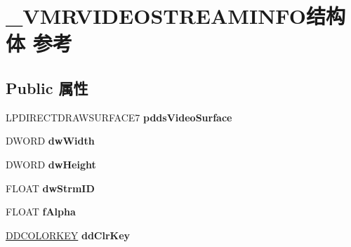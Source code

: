 \hypertarget{struct___v_m_r_v_i_d_e_o_s_t_r_e_a_m_i_n_f_o}{}\section{\+\_\+\+V\+M\+R\+V\+I\+D\+E\+O\+S\+T\+R\+E\+A\+M\+I\+N\+F\+O结构体 参考}
\label{struct___v_m_r_v_i_d_e_o_s_t_r_e_a_m_i_n_f_o}
\subsection*{Public 属性}
\begin{DoxyCompactItemize}
\item 
\mbox{\label{struct___v_m_r_v_i_d_e_o_s_t_r_e_a_m_i_n_f_o_af0eb72a4b7293354ee675c217efdfc65}} 
L\+P\+D\+I\+R\+E\+C\+T\+D\+R\+A\+W\+S\+U\+R\+F\+A\+C\+E7 {\bfseries pdds\+Video\+Surface}
\item 
\mbox{\label{struct___v_m_r_v_i_d_e_o_s_t_r_e_a_m_i_n_f_o_ae1a2bd6cb3e5fb875708aa3d4a28c98e}} 
D\+W\+O\+RD {\bfseries dw\+Width}
\item 
\mbox{\label{struct___v_m_r_v_i_d_e_o_s_t_r_e_a_m_i_n_f_o_ace2129431c600a9fb0950d8db288db9e}} 
D\+W\+O\+RD {\bfseries dw\+Height}
\item 
\mbox{\label{struct___v_m_r_v_i_d_e_o_s_t_r_e_a_m_i_n_f_o_acc3412fab00efe76ab2b3494d40ecb2e}} 
F\+L\+O\+AT {\bfseries dw\+Strm\+ID}
\item 
\mbox{\label{struct___v_m_r_v_i_d_e_o_s_t_r_e_a_m_i_n_f_o_a6d0425b7a77ca5576efdbf7f7b22834c}} 
F\+L\+O\+AT {\bfseries f\+Alpha}
\item 
\mbox{\label{struct___v_m_r_v_i_d_e_o_s_t_r_e_a_m_i_n_f_o_ae9e082dfa9977e8402e4e4ba00f62dd5}} 
\hyperlink{struct_d_d_c_o_l_o_r_k_e_y}{D\+D\+C\+O\+L\+O\+R\+K\+EY} {\bfseries dd\+Clr\+Key}
\item 
\mbox{\label{struct___v_m_r_v_i_d_e_o_s_t_r_e_a_m_i_n_f_o_a2f6fd27832974abb8f7969d7fec4e46d}} 

\end{DoxyCompactItemize}
